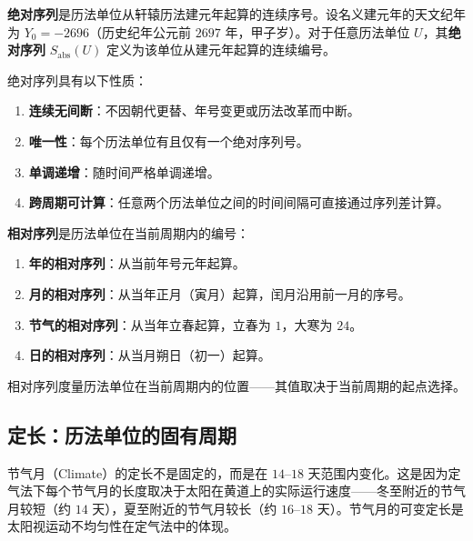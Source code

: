 \begin{definition}[绝对序列]\label{def:absolute_sequence}
\textbf{绝对序列}是历法单位从轩辕历法建元年起算的连续序号。设名义建元年的天文纪年为 \(Y_0=-2696\)（历史纪年公元前 \(2697\) 年，甲子岁）。对于任意历法单位 \(U\)，其\textbf{绝对序列} \(S_{\text{abs}}(U)\) 定义为该单位从建元年起算的连续编号。

绝对序列具有以下性质：
\begin{enumerate}[label=(\roman*)]
    \item \textbf{连续无间断}：不因朝代更替、年号变更或历法改革而中断。
    \item \textbf{唯一性}：每个历法单位有且仅有一个绝对序列号。
    \item \textbf{单调递增}：随时间严格单调递增。
    \item \textbf{跨周期可计算}：任意两个历法单位之间的时间间隔可直接通过序列差计算。
\end{enumerate}
\end{definition}

\begin{definition}[相对序列]\label{def:relative_sequence}
\textbf{相对序列}是历法单位在当前周期内的编号：
\begin{enumerate}[label=(\roman*)]
    \item \textbf{年的相对序列}：从当前年号元年起算。
    \item \textbf{月的相对序列}：从当年正月（寅月）起算，闰月沿用前一月的序号。
    \item \textbf{节气的相对序列}：从当年立春起算，立春为 \(1\)，大寒为 \(24\)。
    \item \textbf{日的相对序列}：从当月朔日（初一）起算。
\end{enumerate}
相对序列度量历法单位在当前周期内的位置——其值取决于当前周期的起点选择。
\end{definition}

\subsection{定长：历法单位的固有周期}

\begin{remark}[节气月的定长范围]\label{rem:climate_fixed_length}
节气月（Climate）的定长不是固定的，而是在 \(14\)--\(18\) 天范围内变化。这是因为定气法下每个节气月的长度取决于太阳在黄道上的实际运行速度——冬至附近的节气月较短（约 \(14\) 天），夏至附近的节气月较长（约 \(16\)--\(18\) 天）。节气月的可变定长是太阳视运动不均匀性在定气法中的体现。
\end{remark}

